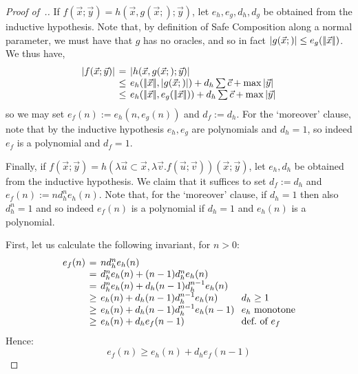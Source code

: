 \documentclass[manuscript,screen]{acmart}
\newcommand{\dfn}{:=}
\theoremstyle{definition}
\theoremstyle{remark}
\newcommand{\permpref}{\subset}
\newcommand{\sumlen}[1]{|\hspace{-.15em}|#1|\hspace{-.15em}|}
\begin{document}
\begin{proof}[Proof of~.]
If $f(\vec x;\vec y) = h(\vec x, g(\vec x;);\vec y)$, let $e_h,e_g,d_h, d_g$ be obtained from the inductive hypothesis. Note that, by definition of Safe Composition along a normal parameter, we must have that $g$ has no oracles, and so in fact $|g(\vec x;)| \leq e_g(\sumlen{\vec x})$.
We thus have,
\[
\arraycolsep=2pt
\begin{array}{rcl}
    |f(\vec x;\vec y)| & = & |h(\vec x, g(\vec x;);\vec y)| \\
     & \leq & e_h(\sumlen{\vec x}, |g(\vec x;)|) + d_h\sum \vec c + \max|\vec y| \\
     & \leq & e_h(\sumlen{\vec x}, e_g(\sumlen{\vec x})) + d_h\sum \vec c + \max|\vec y| 
\end{array}
\]
so we may set $e_f(n)\dfn e_h(n, e_g(n))$ and $d_f \dfn d_h$.
% 
For the `moreover' clause, note that by the inductive hypothesis $e_h,e_g$ are polynomials and $d_h=1$, so indeed $e_f$ is a polynomial and $d_f=1$.

Finally, if $f(\vec x;\vec y) = h(\lambda \vec u \permpref \vec x, \lambda \vec v. f(\vec u;\vec v) ) (\vec x;\vec y)$, let $e_h,d_h$ be obtained from the inductive hypothesis.
We claim that it suffices to set $d_f \dfn d_h$ and $e_f(n) \dfn nd_h^n e_h(n)$.
Note that, for the `moreover' clause, if $d_h=1$ then also $d_h^n = 1$ and so indeed $e_f(n)$ is a polynomial if $d_h=1$ and $e_h(n)$ is a polynomial.

First, let us calculate the following invariant, for $n>0$:
\begin{equation*}
    \arraycolsep=2pt
    \begin{array}{rcll}
    e_f(n) & = & nd_h^n e_h(n) &  \\
        & = & d_h^n e_h(n) + (n-1)d_h^n e_h(n) & \\
        & = & d_h^n e_h(n) + d_h (n-1) d_h^{n-1}e_h(n) \\
        & \geq & e_h(n) + d_h (n-1) d_h^{n-1}e_h(n) & \text{$d_h\geq 1$} \\
        & \geq & e_h(n) + d_h (n-1) d_h^{n-1}e_h(n-1) \  &  \text{$e_h$~monotone} \\
        & \geq & e_h(n) + d_h e_f(n-1) & \text{def.~of $e_f$}
\end{array}
\end{equation*}
Hence:
\begin{equation}
 \label{eq:bnd-lem-rec-fn-inv}
     e_f(n) \geq  e_h(n) + d_h e_f(n-1) 
\end{equation}





\end{proof}
\end{document}
